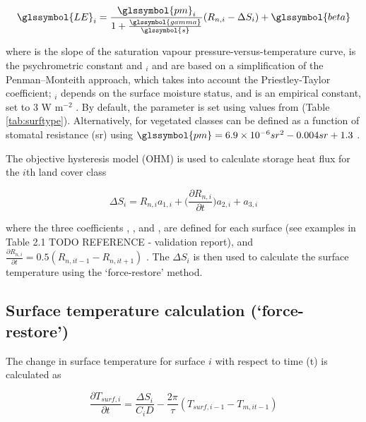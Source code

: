 \documentclass[final,3p,times,authoryear]{elsarticle}
\begin{document}
\begin{equation} 
\glssymbol{LE}_{i} = 
\frac{\glssymbol{pm}_{i}}{1+\frac{\glssymbol{gamma}}{\glssymbol{s}}}
(R_{n,i}-\Delta S_{i})+ \glssymbol{beta}
\label{eq:LE} \end{equation} 

where  is the slope of the saturation vapour pressure-versus-temperature curve,  is the psychrometric constant and $_{i}$ and  are based on a simplification of the Penman–Monteith approach, which takes into account the Priestley-Taylor coefficient; $_{i}$ depends on the surface moisture status, and  is an empirical constant, set to 3 W m$^{-2}$ \citep{Grimmond2002a}. By default, the  parameter is set using values from \cite{Hanna1992} (Table \ref{tab:surftype}). Alternatively,  for vegetated classes can be defined as a function of stomatal resistance (sr) using $\glssymbol{pm} = 6.9\times10^{-6} sr^{2} - 0.004 sr + 1.3$ \citep{DeBruin1983}.  

The objective hysteresis model (OHM) is used to calculate storage heat flux for the $i$th land cover class  \citep{Grimmond2002a} 

\begin{equation} 
\Delta S_{i} = R_{n,i} a_{1,i} + \Big( \frac{\partial R_{n,i}}{\partial t}   \Big)a_{2,i} + a_{3,i}
\label{eq:ohm} \end{equation} 


where the three coefficients , , and , are defined for each surface (see examples in Table 2.1 TODO REFERENCE - validation report), and $\frac{\partial R_{n,i}}{\partial t} =0.5(R_{n,it-1} - R_{n,it+1})$  .  The $\Delta S_{i}$ is then used to calculate the surface temperature using the `force-restore' method.


\subsection{Surface temperature calculation (`force-restore')}\label{sec:tsurf}

The change in surface temperature  for surface $i$ with respect to time (t) is calculated as

\begin{equation} 
\frac{\partial T_{surf,i}}{\partial t}= \frac{\Delta S_{i}}{C_{i} D} - \frac{2 \pi}{\tau} (T_{surf,i -1} - T_{m,it-1})
\label{eq:force} \end{equation} 
\end{document}
